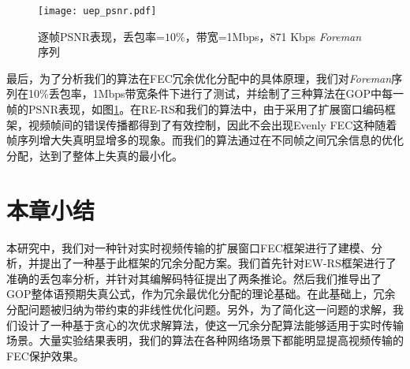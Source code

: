 \begin{figure}[htbp]
  \centering
  \texttt{[image: uep\_psnr.pdf]}
  \caption{逐帧PSNR表现，丢包率=$10\%$，带宽=1Mbps，871 Kbps \emph{Foreman}序列}\label{fig:psnr}
\end{figure}

最后，为了分析我们的算法在FEC冗余优化分配中的具体原理，我们对\emph{Foreman}序列在10\%丢包率，1Mbps带宽条件下进行了测试，并绘制了三种算法在GOP中每一帧的PSNR表现，如图\ref{fig:psnr}。在RE-RS和我们的算法中，由于采用了扩展窗口编码框架，视频帧间的错误传播都得到了有效控制，因此不会出现Evenly FEC这种随着帧序列增大失真明显增多的现象。而我们的算法通过在不同帧之间冗余信息的优化分配，达到了整体上失真的最小化。


\section{本章小结}
本研究中，我们对一种针对实时视频传输的扩展窗口FEC框架进行了建模、分析，并提出了一种基于此框架的冗余分配方案。我们首先针对EW-RS框架进行了准确的丢包率分析，并针对其编解码特征提出了两条推论。然后我们推导出了GOP整体语预期失真公式，作为冗余最优化分配的理论基础。在此基础上，冗余分配问题被归纳为带约束的非线性优化问题。另外，为了简化这一问题的求解，我们设计了一种基于贪心的次优求解算法，使这一冗余分配算法能够适用于实时传输场景。大量实验结果表明，我们的算法在各种网络场景下都能明显提高视频传输的FEC保护效果。

